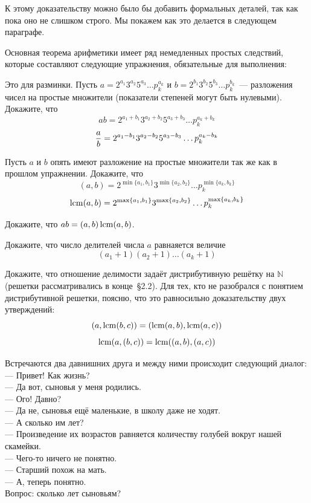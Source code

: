 К этому доказательству можно было бы добавить формальных деталей, так как пока оно не слишком строго. Мы покажем как это делается в следующем параграфе.

Основная теорема арифметики имеет ряд немедленных простых следствий, которые составляют следующие упражнения, обязательные для выполнения:

\begin{exercise}
Это для разминки. Пусть $a = 2^{a_1}3^{a_2}5^{a_3}\ldots p_k^{a_k}$ и $b = 2^{b_1}3^{b_2}5^{b_3}\ldots p_k^{b_k}$~— разложения чисел на простые множители (показатели степеней могут быть нулевыми). Докажите, что
$$ab = 2^{a_1+b_1}3^{a_2+b_2}5^{a_3+b_3}\ldots p_k^{a_k+b_k}$$
$${a\over b} = 2^{a_1-b_1}3^{a_2-b_2}5^{a_3-b_3}\ldots p_k^{a_k-b_k}$$
\end{exercise}

\begin{exercise}
Пусть $a$ и $b$ опять имеют разложение на простые множители так же как в прошлом упражнении. Докажите, что
$$(a, b) = 2^{\min\{a_1, b_1\}} 3^{\min\{a_2, b_2\}}\ldots p_k^{\min\{a_k, b_k\}}$$
$$\operatorname{lcm}(a, b) = 2^{\max\{a_1, b_1\}} 3^{\max\{a_2, b_2\}}\ldots p_k^{\max\{a_k, b_k\}}$$
\end{exercise}

\begin{exercise}
Докажите, что $ab = (a, b) \operatorname{lcm}(a, b)$.
\end{exercise}

\begin{exercise}
Докажите, что число делителей числа $a$ равнаяется величие
$$(a_1 + 1)(a_2 + 1)\ldots(a_k + 1)$$
\end{exercise}

\begin{exercise}
Докажите, что отношение делимости задаёт дистрибутивную решётку на $\mathbb{N}$ (решетки рассматривались в конце~\S2.2). Для тех, кто не разобрался с понятием дистрибутивной решетки, поясню, что это равносильно доказательству двух утверждений:
$$(a, \operatorname{lcm}(b, c)) = (\operatorname{lcm}(a, b), \operatorname{lcm}(a, c))$$
$$\operatorname{lcm}(a, (b, c)) = \operatorname{lcm}((a, b), (a, c))$$
\end{exercise}

\begin{exercise}
Встречаются два давнишних друга и между ними происходит следующий диалог:\\
--- Привет! Как жизнь?\\
--- Да вот, сыновья у меня родились.\\
--- Ого! Давно?\\
--- Да не, сыновья ещё маленькие, в школу даже не ходят.\\
--- А сколько им лет?\\
--- Произведение их возрастов равняется количеству голубей вокруг нашей скамейки.\\
--- Чего-то ничего не понятно.\\
--- Старший похож на мать.\\
--- А, теперь понятно.\\
Вопрос: сколько лет сыновьям?
\end{exercise}

